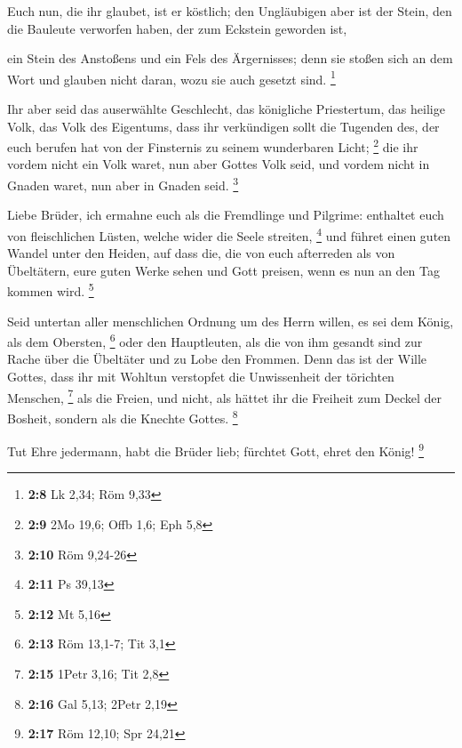  Euch nun, die ihr glaubet, ist er köstlich; den Ungläubigen
aber ist der Stein, den die Bauleute verworfen haben, der zum Eckstein
geworden ist,

 ein Stein des Anstoßens und ein Fels des Ärgernisses; denn
sie stoßen sich an dem Wort und glauben nicht daran, wozu sie auch
gesetzt sind. \footnote{\textbf{2:8} Lk 2,34; Röm 9,33}

 Ihr aber seid das auserwählte Geschlecht, das königliche
Priestertum, das heilige Volk, das Volk des Eigentums, dass ihr
verkündigen sollt die Tugenden des, der euch berufen hat von der
Finsternis zu seinem wunderbaren Licht; \footnote{\textbf{2:9} 2Mo 19,6;
  Offb 1,6; Eph 5,8}  die ihr vordem nicht ein Volk waret,
nun aber Gottes Volk seid, und vordem nicht in Gnaden waret, nun aber in
Gnaden seid. \footnote{\textbf{2:10} Röm 9,24-26}

 Liebe Brüder, ich ermahne euch als die Fremdlinge und
Pilgrime: enthaltet euch von fleischlichen Lüsten, welche wider die
Seele streiten, \footnote{\textbf{2:11} Ps 39,13}  und
führet einen guten Wandel unter den Heiden, auf dass die, die von euch
afterreden als von Übeltätern, eure guten Werke sehen und Gott preisen,
wenn es nun an den Tag kommen wird. \footnote{\textbf{2:12} Mt 5,16}

 Seid untertan aller menschlichen Ordnung um des Herrn
willen, es sei dem König, als dem Obersten, \footnote{\textbf{2:13} Röm
  13,1-7; Tit 3,1}  oder den Hauptleuten, als die von ihm
gesandt sind zur Rache über die Übeltäter und zu Lobe den Frommen.
 Denn das ist der Wille Gottes, dass ihr mit Wohltun
verstopfet die Unwissenheit der törichten Menschen, \footnote{\textbf{2:15}
  1Petr 3,16; Tit 2,8}  als die Freien, und nicht, als
hättet ihr die Freiheit zum Deckel der Bosheit, sondern als die Knechte
Gottes. \footnote{\textbf{2:16} Gal 5,13; 2Petr 2,19}

 Tut Ehre jedermann, habt die Brüder lieb; fürchtet Gott,
ehret den König! \footnote{\textbf{2:17} Röm 12,10; Spr 24,21}

